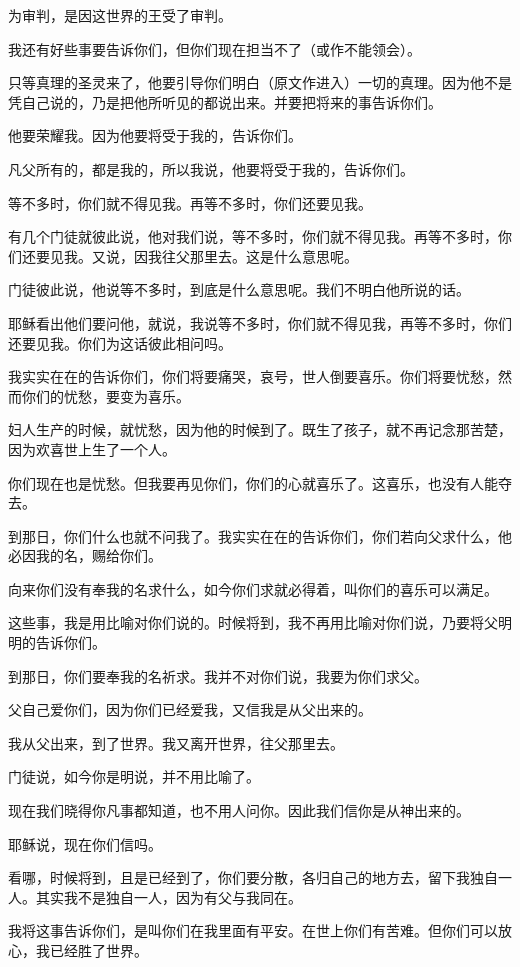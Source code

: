 \documentclass[12pt,oneside]{book}
\begin{document}
为审判，是因这世界的王受了审判。

我还有好些事要告诉你们，但你们现在担当不了（或作不能领会）。

只等真理的圣灵来了，他要引导你们明白（原文作进入）一切的真理。因为他不是凭自己说的，乃是把他所听见的都说出来。并要把将来的事告诉你们。

他要荣耀我。因为他要将受于我的，告诉你们。

凡父所有的，都是我的，所以我说，他要将受于我的，告诉你们。

等不多时，你们就不得见我。再等不多时，你们还要见我。

有几个门徒就彼此说，他对我们说，等不多时，你们就不得见我。再等不多时，你们还要见我。又说，因我往父那里去。这是什么意思呢。

门徒彼此说，他说等不多时，到底是什么意思呢。我们不明白他所说的话。

耶稣看出他们要问他，就说，我说等不多时，你们就不得见我，再等不多时，你们还要见我。你们为这话彼此相问吗。

我实实在在的告诉你们，你们将要痛哭，哀号，世人倒要喜乐。你们将要忧愁，然而你们的忧愁，要变为喜乐。

妇人生产的时候，就忧愁，因为他的时候到了。既生了孩子，就不再记念那苦楚，因为欢喜世上生了一个人。

你们现在也是忧愁。但我要再见你们，你们的心就喜乐了。这喜乐，也没有人能夺去。

到那日，你们什么也就不问我了。我实实在在的告诉你们，你们若向父求什么，他必因我的名，赐给你们。

向来你们没有奉我的名求什么，如今你们求就必得着，叫你们的喜乐可以满足。

这些事，我是用比喻对你们说的。时候将到，我不再用比喻对你们说，乃要将父明明的告诉你们。

到那日，你们要奉我的名祈求。我并不对你们说，我要为你们求父。

父自己爱你们，因为你们已经爱我，又信我是从父出来的。

我从父出来，到了世界。我又离开世界，往父那里去。

门徒说，如今你是明说，并不用比喻了。

现在我们晓得你凡事都知道，也不用人问你。因此我们信你是从神出来的。

耶稣说，现在你们信吗。

看哪，时候将到，且是已经到了，你们要分散，各归自己的地方去，留下我独自一人。其实我不是独自一人，因为有父与我同在。

我将这事告诉你们，是叫你们在我里面有平安。在世上你们有苦难。但你们可以放心，我已经胜了世界。
\end{document}

